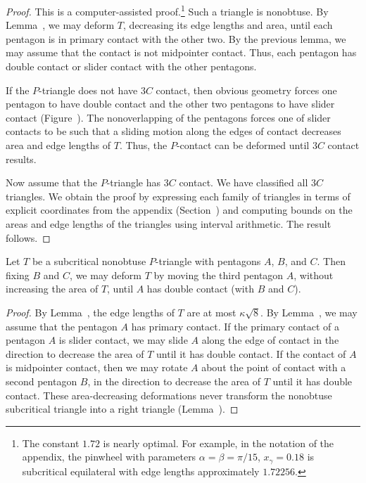 \begin{proof} This is a computer-assisted proof.\footnote{The constant
    $1.72$ is nearly optimal.  For example, in the notation of the
    appendix, the pinwheel with parameters $\alpha=\beta=\pi/15$,
    $x_\gamma = 0.18$ is subcritical equilateral with edge lengths
    approximately $1.72256$.} Such a triangle is nonobtuse.  By
  Lemma~, we may deform $T$, decreasing its
  edge lengths and area, until each pentagon is in primary contact
  with the other two.  By the previous lemma, we may assume that the
  contact is not midpointer contact.  Thus, each pentagon has double
  contact or slider contact with the other pentagons.

  If the $P$-triangle does not have $3C$ contact, then obvious
  geometry forces one pentagon to have double contact and the other
  two pentagons to have slider contact (Figure~).
  The nonoverlapping of the pentagons forces one of slider contacts to
  be such that a sliding motion along the edges of contact decreases
  area and edge lengths of $T$.  Thus, the $P$-contact can be deformed
  until $3C$ contact results.



Now assume that the $P$-triangle has $3C$ contact.
We have classified all $3C$ triangles.  We obtain the proof
by expressing each family of triangles in terms of explicit
coordinates from the appendix (Section~) and
computing bounds on the areas and edge lengths of the triangles using
interval arithmetic.  The result follows.
\end{proof}

\begin{lemma} 
  Let $T$ be a subcritical nonobtuse $P$-triangle with pentagons $A$,
  $B$, and $C$.  Then fixing $B$ and $C$, we may deform $T$ by moving
  the third pentagon $A$, without increasing the area of $T$, until
  $A$ has double contact (with $B$ and $C$).
\end{lemma}

\begin{proof}
  By Lemma~, the edge lengths of $T$ are at most
  $\kappa\sqrt8$.  By Lemma~, we may assume
  that the pentagon $A$ has primary contact.  If the primary contact
  of a pentagon $A$ is slider contact, we may slide $A$ along the edge
  of contact in the direction to decrease the area of $T$ until it has
  double contact.  If the contact of $A$ is midpointer contact, then
  we may rotate $A$ about the point of contact with a second pentagon
  $B$, in the direction to decrease the area of $T$ until it has
  double contact.  These area-decreasing deformations never transform
  the nonobtuse subcritical triangle into a right triangle
  (Lemma~).
\end{proof}


